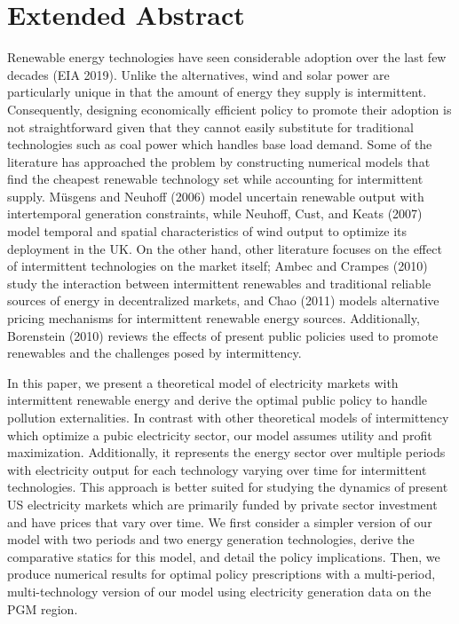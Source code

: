 \documentclass[11pt,a4paper]{extarticle}
\begin{document}
	
\title{}

\author[]{Saketh Aleti}

\affil[]{\small{}}

\date{\vspace{-1em}\small{\today}}

\maketitle

\section{Extended Abstract}

Renewable energy technologies have seen considerable adoption over the last few decades (EIA 2019). Unlike the alternatives, wind and solar power are particularly unique in that the amount of energy they supply is intermittent. Consequently, designing economically efficient policy to promote their adoption is not straightforward given that they cannot easily substitute for traditional technologies such as coal power which handles base load demand. Some of the literature has approached the problem by constructing numerical models that find the cheapest renewable technology set while accounting for intermittent supply. Müsgens and Neuhoff (2006) model uncertain renewable output with intertemporal generation constraints, while Neuhoff, Cust, and Keats (2007) model temporal and spatial characteristics of wind output to optimize its deployment in the UK. On the other hand, other literature focuses on the effect of intermittent technologies on the market itself; Ambec and Crampes (2010) study the interaction between intermittent renewables and traditional reliable sources of energy in decentralized markets, and Chao (2011) models alternative pricing mechanisms for intermittent renewable energy sources. Additionally, Borenstein (2010) reviews the effects of present public policies used to promote renewables and the challenges posed by intermittency. 

In this paper, we present a theoretical model of electricity markets with intermittent renewable energy and derive the optimal public policy to handle pollution externalities. In contrast with other theoretical models of intermittency which optimize a pubic electricity sector, our model assumes utility and profit maximization. Additionally, it represents the energy sector over multiple periods with electricity output for each technology varying over time for intermittent technologies. This approach is better suited for studying the dynamics of present US electricity markets which are primarily funded by private sector investment and have prices that vary over time. We first consider a simpler version of our model with two periods and two energy generation technologies, derive the comparative statics for this model, and detail the policy implications. Then, we produce numerical results for optimal policy prescriptions with a multi-period, multi-technology version of our model using electricity generation data on the PGM region.
\end{document}
